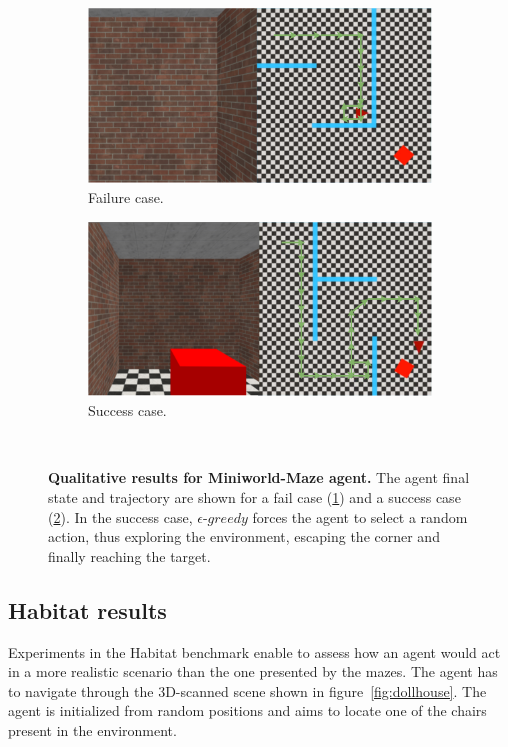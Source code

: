 \begin{figure}
    \centering
    \begin{subfigure}[b]{0.49\textwidth}
        \centering
        \includegraphics[width=\textwidth]{figures/understanding_vsn/qualitative_results/fail}
        \caption{Failure case.}
        \label{fig:maze_qualitative_fail}
    \end{subfigure}
    \hfill
    \begin{subfigure}[b]{0.49\textwidth}
        \centering
        \includegraphics[width=\textwidth]{figures/understanding_vsn/qualitative_results/success}
        \caption{Success case.}
        \label{fig:maze_qualitative_success}
    \end{subfigure}~\caption{\textbf{Qualitative results for Miniworld-Maze agent.} The agent final state and trajectory are shown for a fail case (\ref{fig:maze_qualitative_fail}) and a success case (\ref{fig:maze_qualitative_success}). In the success case, $\epsilon\text{-}greedy$ forces the agent to select a random action, thus exploring the environment, escaping the corner and finally reaching the target.}
    \label{fig:maze_qualitative}
\end{figure}

\subsection{Habitat results}\label{subsec:habitat-results}
Experiments in the Habitat benchmark enable to assess how an agent would act in a more realistic scenario than the one presented by the mazes.
The agent has to navigate through the 3D-scanned scene shown in figure~\ref{fig:dollhouse}.
The agent is initialized from random positions and aims to locate one of the chairs present in the environment.

